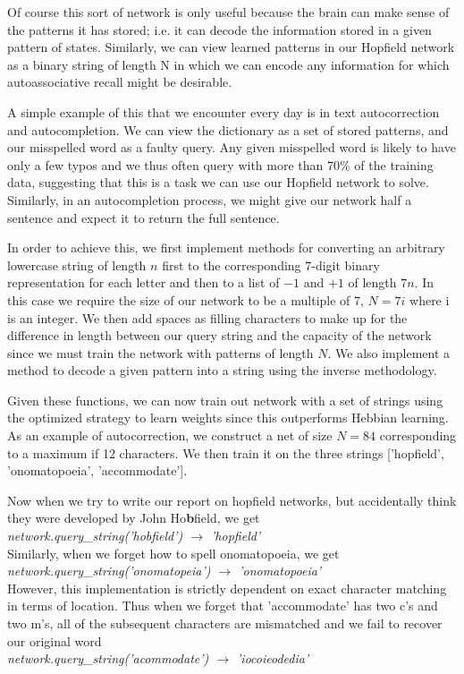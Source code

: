 \documentclass{article}
\begin{document}
Of course this sort of network is only useful because the brain can make sense of the patterns it has stored; i.e. it can decode the information stored in a given pattern of states. Similarly, we can view learned patterns in our Hopfield network as a binary string of length N in which we can encode any information for which autoassociative recall might be desirable.

A simple example of this that we encounter every day is in text autocorrection and autocompletion. We can view the dictionary as a set of stored patterns, and our misspelled word as a faulty query. Any given misspelled word is likely to have only a few typos and we thus often query with more than 70\% of the training data, suggesting that this is a task we can use our Hopfield network to solve. Similarly, in an autocompletion process, we might give our network half a sentence and expect it to return the full sentence.

In order to achieve this, we first implement methods for converting an arbitrary lowercase string of length $n$ first to the corresponding 7-digit binary representation for each letter and then to a list of $-1$ and $+1$ of length $7n$. In this case we require the size of our network to be a multiple of 7, $N = 7i$ where i is an integer. We then add spaces as filling characters to make up for the difference in length between our query string and the capacity of the network since we must train the network with patterns of length $N$. We also implement a method to decode a given pattern into a string using the inverse methodology.

Given these functions, we can now train out network with a set of strings using the optimized strategy to learn weights since this outperforms Hebbian learning. As an example of autocorrection, we construct a net of size $N=84$ corresponding to a maximum if 12 characters. We then train it on the three strings ['hopfield', 'onomatopoeia', 'accommodate'].

Now when we try to write our report on hopfield networks, but accidentally think they were developed by John Ho\textbf{b}field, we get\\
\textit{network.query\_string('hobfield') $\rightarrow$ 'hopfield'}\\
Similarly, when we forget how to spell onomatopoeia, we get\\
\textit{network.query\_string('onomatopeia') $\rightarrow$ 'onomatopoeia'}\\

However, this implementation is strictly dependent on exact character matching in terms of location. Thus when we forget that 'accommodate' has two c's and two m's, all of the subsequent characters are mismatched and we fail to recover our original word\\
\textit{network.query\_string('acommodate') $\rightarrow$ 'iocoieodedia'}\\
\end{document}
